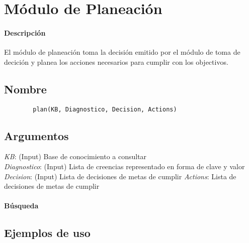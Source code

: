 \documentclass[11pt,fleqn]{article}
\begin{document}
\section{Módulo de Planeación}

\paragraph{Descripción} El módulo de planeación toma la decisión emitido por el módulo de toma de decición y planea los acciones necesarios para cumplir con los objectivos.

\subsection*{Nombre}
	\begin{verbatim}
		plan(KB, Diagnostico, Decision, Actions)
	\end{verbatim}

\subsection*{Argumentos}
	\textit{KB}: (Input) Base de conocimiento a consultar \\
	\textit{Diagnostico}: (Input) Lista de creencias representado en forma de clave y valor \\
	\textit{Decision}: (Input) Lista de decisiones de metas de cumplir 
	\textit{Actions}: Lista de decisiones de metas de cumplir 

\paragraph{Búsqueda} 

\subsection*{Ejemplos de uso}
\end{document}
